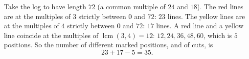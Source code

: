 Take the log to have length $72$ (a common multiple of $24$ and $18$). The red lines are at the multiples of $3$ strictly between $0$ and $72$: $23$ lines. The yellow lines are at the multiples of $4$ strictly between $0$ and $72$: $17$ lines. A red line and a yellow line coincide at the multiples of $\operatorname{lcm}(3,4)=12$: $12,24,36,48,60$, which is $5$ positions. So the number of different marked positions, and of cuts, is
\[
23+17-5=\boxed{35}.
\]
